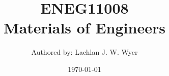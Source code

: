 \documentclass[a5paper]{article}
\title{ENEG11008 \\ Materials of Engineers}
\author{Authored by: Lachlan J. W. Wyer}
\date{\today}
\begin{document}
	\maketitle
	\pagebreak
	\tableofcontents
	\pagebreak
	\raggedright
\end{document}
